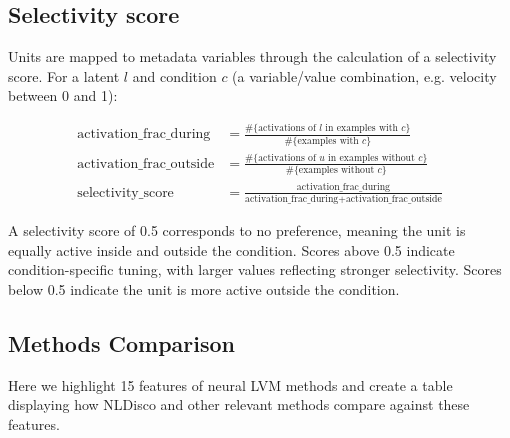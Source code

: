 \subsection{Selectivity score}
\label{subsection:selectivity_score}

Units are mapped to metadata variables through the calculation of a selectivity score. For a latent $l$ and condition $c$ (a variable/value combination, e.g. velocity between 0 and 1):

\begin{align}
\text{activation\_frac\_during} &=
\frac{\#\{\text{activations of } l \text{ in examples with } c\}}
     {\#\{\text{examples with } c\}} \\[6pt]
\text{activation\_frac\_outside} &=
\frac{\#\{\text{activations of } u \text{ in examples without } c\}}
     {\#\{\text{examples without } c\}} \\[6pt]
\text{selectivity\_score} &=
\frac{\text{activation\_frac\_during}}
     {\text{activation\_frac\_during} + \text{activation\_frac\_outside}}
\end{align}

A selectivity score of 0.5 corresponds to no preference, meaning the unit is equally active inside and outside the condition. Scores above 0.5 indicate condition-specific tuning, with larger values reflecting stronger selectivity. Scores below 0.5 indicate the unit is more active outside the condition.

\clearpage

\subsection{Methods Comparison}

Here we highlight 15 features of neural LVM methods and create a table displaying how NLDisco and other relevant methods compare against these features.

